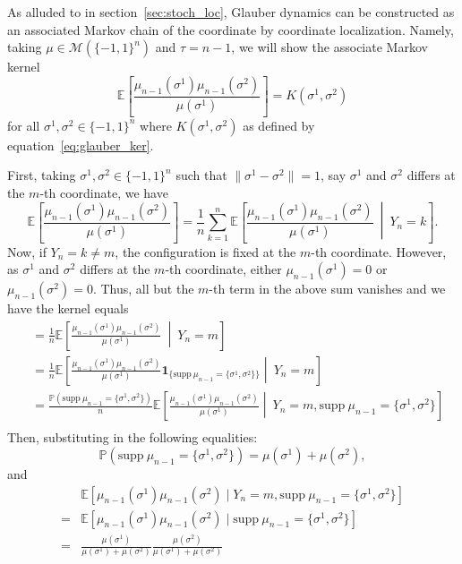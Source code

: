 As alluded to in section~\ref{sec:stoch_loc}, Glauber dynamics can be constructed as an associated Markov 
chain of the coordinate by coordinate localization. Namely, taking \(\mu \in \mathcal{M}(\{-1, 1\}^n)\)
and \(\tau = n - 1\), we will show the associate Markov kernel 
\[\mathbb{E}\left[\frac{\mu_{n - 1}(\sigma^1)\mu_{n - 1}(\sigma^2)}{\mu(\sigma^1)}\right] = K(\sigma^1, \sigma^2)\]
for all \(\sigma^1, \sigma^2 \in \{-1, 1\}^n\) where \(K(\sigma^1, \sigma^2)\) as defined by equation~\eqref{eq:glauber_ker}.

First, taking \(\sigma^1, \sigma^2 \in \{-1, 1\}^n\) such that \(\|\sigma^1 - \sigma^2\| = 1\), say \(\sigma^1\) 
and \(\sigma^2\) differs at the \(m\)-th coordinate, we have 
\[\mathbb{E}\left[\frac{\mu_{n - 1}(\sigma^1)\mu_{n - 1}(\sigma^2)}{\mu(\sigma^1)}\right] = \frac{1}{n}\sum_{k = 1}^n \mathbb{E}
    \left[\frac{\mu_{n - 1}(\sigma^1)\mu_{n - 1}(\sigma^2)}{\mu(\sigma^1)}\ \middle\vert\ Y_n = k\right].\]
Now, if \(Y_n = k \neq m\), the configuration is fixed at the \(m\)-th coordinate. However, as \(\sigma^1\) and 
\(\sigma^2\) differs at the \(m\)-th coordinate, either \(\mu_{n - 1}(\sigma^1) = 0\) or \(\mu_{n - 1}(\sigma^2) = 0\).
Thus, all but the \(m\)-th term in the above sum vanishes and we have the kernel equals
\begin{align*}
  & = \frac{1}{n} \mathbb{E}\left[\frac{\mu_{n - 1}(\sigma^1)\mu_{n - 1}(\sigma^2)}{\mu(\sigma^1)}\ \middle\vert\ Y_n = m\right]\\
  & = \frac{1}{n} \mathbb{E}\left[\frac{\mu_{n - 1}(\sigma^1)\mu_{n - 1}(\sigma^2)}{\mu(\sigma^1)}
    \mathbf{1}_{\{\text{supp}\ \mu_{n - 1} = \{\sigma^1, \sigma^2\}\}} \middle\vert\ Y_n = m\right]\\
  & = \frac{\mathbb{P}(\text{supp}\ \mu_{n - 1} = \{\sigma^1, \sigma^2\})}{n} 
    \mathbb{E}\left[\frac{\mu_{n - 1}(\sigma^1)\mu_{n - 1}(\sigma^2)}{\mu(\sigma^1)}
    \middle\vert\ Y_n = m, \text{supp}\ \mu_{n - 1} = \{\sigma^1, \sigma^2\}\right]\\
\end{align*}
Then, substituting in the following equalities:
\[\mathbb{P}(\text{supp}\ \mu_{n - 1} = \{\sigma^1, \sigma^2\}) = \mu(\sigma^1) + \mu(\sigma^2),\]
and
\begin{align*}
  & \mathbb{E}[\mu_{n - 1}(\sigma^1)\mu_{n - 1}(\sigma^2) \mid Y_n = m, \text{supp}\ \mu_{n - 1} = \{\sigma^1, \sigma^2\}]\\
  = & \mathbb{E}[\mu_{n - 1}(\sigma^1)\mu_{n - 1}(\sigma^2) \mid \text{supp}\ \mu_{n - 1} = \{\sigma^1, \sigma^2\}]\\
  = & \frac{\mu(\sigma^1)}{\mu(\sigma^1) + \mu(\sigma^2)} \frac{\mu(\sigma^2)}{\mu(\sigma^1) + \mu(\sigma^2)}
\end{align*}
